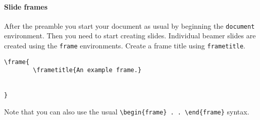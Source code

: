 \paragraph{Slide frames}

After the preamble you start your document as usual by beginning the \texttt{document} environment. Then you need to start creating slides. Individual beamer slides are created using the \texttt{frame} environments. Create a frame title using \texttt{frametitle}.

\begin{knitrout}
    \color{fgcolor}
    \begin{kframe}
        \begin{verbatim}
\frame{
        \frametitle{An example frame.}


}
        \end{verbatim}
    \end{kframe}
\end{knitrout}

\noindent Note that you can also use the usual \verb|\begin{frame} . . \end{frame}| syntax.

